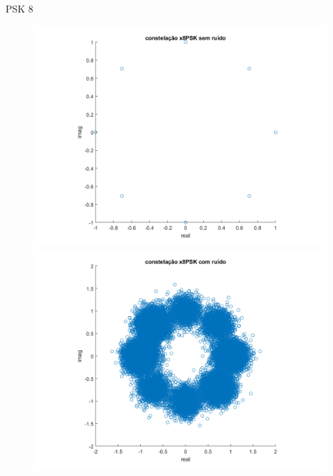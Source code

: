 ﻿\documentclass[mathserif]{beamer}
\begin{document}
	\begin{frame}{PSK 8}
		\begin{figure}
			\centering
			\includegraphics[scale=0.3]{../NossoCodigo2/figuras/modula3.png}
			\includegraphics[scale=0.3]{../NossoCodigo2/figuras/modula9.png}
		\end{figure}
	\end{frame}
\end{document}
